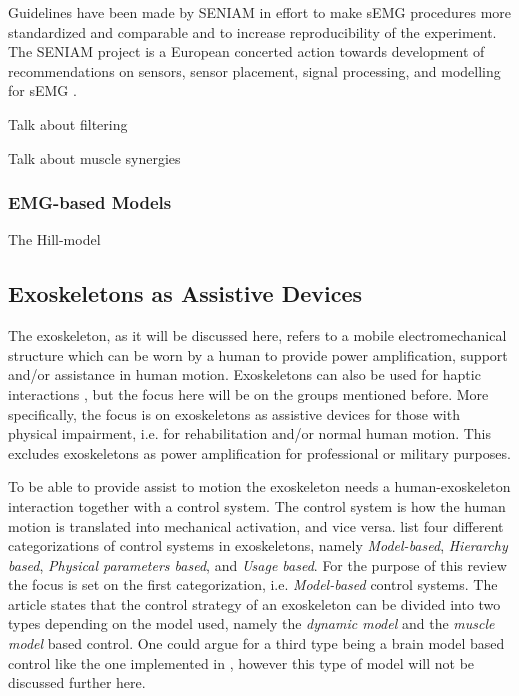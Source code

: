 Guidelines have been made by \ac{SENIAM} in effort to make \ac{sEMG} procedures more standardized and comparable and to increase reproducibility of the experiment. 
The \ac{SENIAM} project is a European concerted action towards development of recommendations on sensors, sensor placement, signal processing, and modelling for \ac{sEMG} \cite{Hermens2000}.

Talk about filtering

Talk about muscle synergies

\subsubsection{\ac{EMG}-based Models}
\label{sec:A-EMGBasedModels}
The Hill-model 



\subsection{Exoskeletons as Assistive Devices}
\label{sec:A-Exoskeletons}
The exoskeleton, as it will be discussed here, refers to a mobile electromechanical structure which can be worn by a human to provide power amplification, support and/or assistance in human motion. Exoskeletons can also be used for haptic interactions \cite{Anam2012}, but the focus here will be on the groups mentioned before. More specifically, the focus is on exoskeletons as assistive devices for those with physical impairment, i.e. for rehabilitation and/or normal human motion. This excludes exoskeletons as power amplification for professional or military purposes.

To be able to provide assist to motion the exoskeleton needs a human-exoskeleton interaction together with a control system. 
The control system is how the human motion is translated into mechanical activation, and vice versa. 
 list four different categorizations of control systems in exoskeletons, namely \textit{Model-based}, \textit{Hierarchy based}, \textit{Physical parameters based}, and \textit{Usage based}. 
For the purpose of this review the focus is set on the first categorization, i.e. \textit{Model-based} control systems.
The article states that the control strategy of an exoskeleton can be divided into two types depending on the model used, namely the \textit{dynamic model} and the \textit{muscle model} based control. 
One could argue for a third type being a brain model based control like the one implemented in \cite{Wang2017a}, however this type of model will not be discussed further here.

